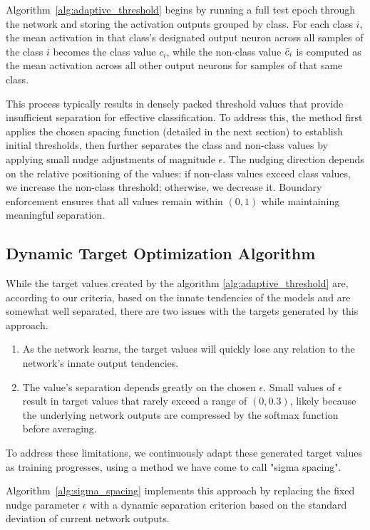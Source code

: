\documentclass[12pt,fleqn,a4paper]{article}
\begin{document}
Algorithm~\ref{alg:adaptive_threshold} begins by running a full test epoch through the network and storing the activation outputs grouped by class. For each class $i$, the mean activation in that class's designated output neuron across all samples of the class $i$ becomes the class value $c_i$, while the non-class value $\Bar{c}_i$ is computed as the mean activation across all other output neurons for samples of that same class.

This process typically results in densely packed threshold values that provide insufficient separation for effective classification. To address this, the method first applies the chosen spacing function (detailed in the next section) to establish initial thresholds, then further separates the class and non-class values by applying small nudge adjustments of magnitude $\epsilon$. The nudging direction depends on the relative positioning of the values: if non-class values exceed class values, we increase the non-class threshold; otherwise, we decrease it. Boundary enforcement ensures that all values remain within $(0,1)$ while maintaining meaningful separation.

\subsection{Dynamic Target Optimization Algorithm}
While the target values created by the algorithm \ref{alg:adaptive_threshold} are, according to our criteria, based on the innate tendencies of the models and are somewhat well separated, there are two issues with the targets generated by this approach.
\begin{enumerate}
    \item As the network learns, the target values will quickly lose any relation to the network's innate output tendencies.
    \item The value's separation depends greatly on the chosen $\epsilon$. Small values of $\epsilon$ result in target values that rarely exceed a range of $(0, 0.3)$, likely because the underlying network outputs are compressed by the softmax function before averaging.
\end{enumerate}
To address these limitations, we continuously adapt these generated target values as training progresses, using a method we have come to call "sigma spacing". 

Algorithm~\ref{alg:sigma_spacing} implements this approach by replacing the fixed nudge parameter $\epsilon$ with a dynamic separation criterion based on the standard deviation of current network outputs.
\end{document}
